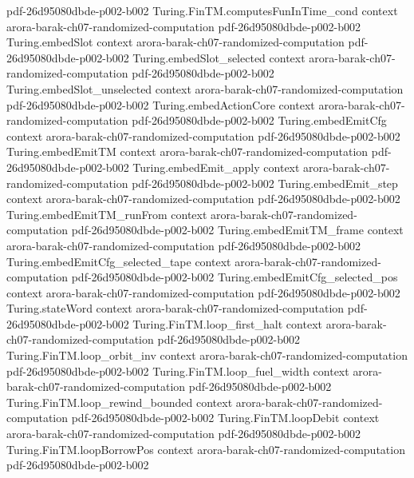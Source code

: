 \begin{theorem}
  {pdf-26d95080dbde-p002-b002}
\proofstep
  {Turing.FinTM.computesFunInTime_cond}
  {context}
  {arora-barak-ch07-randomized-computation}
  {pdf-26d95080dbde-p002-b002}
\proofstep
  {Turing.embedSlot}
  {context}
  {arora-barak-ch07-randomized-computation}
  {pdf-26d95080dbde-p002-b002}
\proofstep
  {Turing.embedSlot_selected}
  {context}
  {arora-barak-ch07-randomized-computation}
  {pdf-26d95080dbde-p002-b002}
\proofstep
  {Turing.embedSlot_unselected}
  {context}
  {arora-barak-ch07-randomized-computation}
  {pdf-26d95080dbde-p002-b002}
\proofstep
  {Turing.embedActionCore}
  {context}
  {arora-barak-ch07-randomized-computation}
  {pdf-26d95080dbde-p002-b002}
\proofstep
  {Turing.embedEmitCfg}
  {context}
  {arora-barak-ch07-randomized-computation}
  {pdf-26d95080dbde-p002-b002}
\proofstep
  {Turing.embedEmitTM}
  {context}
  {arora-barak-ch07-randomized-computation}
  {pdf-26d95080dbde-p002-b002}
\proofstep
  {Turing.embedEmit_apply}
  {context}
  {arora-barak-ch07-randomized-computation}
  {pdf-26d95080dbde-p002-b002}
\proofstep
  {Turing.embedEmit_step}
  {context}
  {arora-barak-ch07-randomized-computation}
  {pdf-26d95080dbde-p002-b002}
\proofstep
  {Turing.embedEmitTM_runFrom}
  {context}
  {arora-barak-ch07-randomized-computation}
  {pdf-26d95080dbde-p002-b002}
\proofstep
  {Turing.embedEmitTM_frame}
  {context}
  {arora-barak-ch07-randomized-computation}
  {pdf-26d95080dbde-p002-b002}
\proofstep
  {Turing.embedEmitCfg_selected_tape}
  {context}
  {arora-barak-ch07-randomized-computation}
  {pdf-26d95080dbde-p002-b002}
\proofstep
  {Turing.embedEmitCfg_selected_pos}
  {context}
  {arora-barak-ch07-randomized-computation}
  {pdf-26d95080dbde-p002-b002}
\proofstep
  {Turing.stateWord}
  {context}
  {arora-barak-ch07-randomized-computation}
  {pdf-26d95080dbde-p002-b002}
\proofstep
  {Turing.FinTM.loop_first_halt}
  {context}
  {arora-barak-ch07-randomized-computation}
  {pdf-26d95080dbde-p002-b002}
\proofstep
  {Turing.FinTM.loop_orbit_inv}
  {context}
  {arora-barak-ch07-randomized-computation}
  {pdf-26d95080dbde-p002-b002}
\proofstep
  {Turing.FinTM.loop_fuel_width}
  {context}
  {arora-barak-ch07-randomized-computation}
  {pdf-26d95080dbde-p002-b002}
\proofstep
  {Turing.FinTM.loop_rewind_bounded}
  {context}
  {arora-barak-ch07-randomized-computation}
  {pdf-26d95080dbde-p002-b002}
\proofstep
  {Turing.FinTM.loopDebit}
  {context}
  {arora-barak-ch07-randomized-computation}
  {pdf-26d95080dbde-p002-b002}
\proofstep
  {Turing.FinTM.loopBorrowPos}
  {context}
  {arora-barak-ch07-randomized-computation}
  {pdf-26d95080dbde-p002-b002}
\proofstep

\end{theorem}
